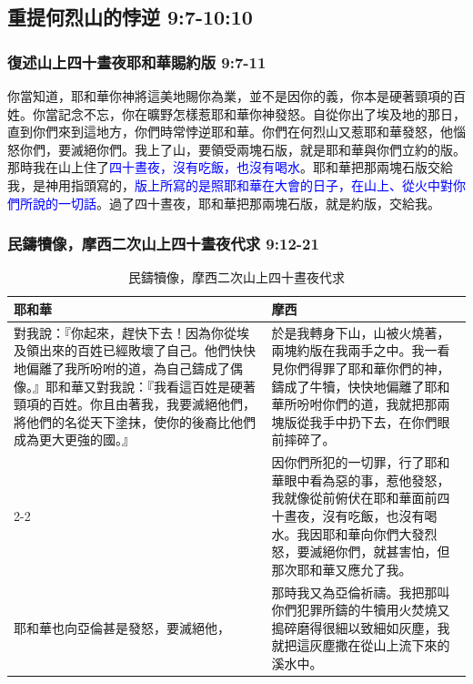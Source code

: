 \subsection{重提何烈山的悖逆 9:7-10:10}
\subsubsection{復述山上四十晝夜耶和華賜約版 9:7-11}
你當知道，耶和華你神將這美地賜你為業，並不是因你的義，你本是硬著頸項的百姓。你當記念不忘，你在曠野怎樣惹耶和華你神發怒。自從你出了埃及地的那日，直到你們來到這地方，你們時常悖逆耶和華。你們在何烈山又惹耶和華發怒，他惱怒你們，要滅絕你們。我上了山，要領受兩塊石版，就是耶和華與你們立約的版。那時我在山上住了\textcolor{blue}{四十晝夜，沒有吃飯，也沒有喝水}。耶和華把那兩塊石版交給我，是神用指頭寫的，\textcolor{blue}{版上所寫的是照耶和華在大會的日子，在山上、從火中對你們所說的一切話}。過了四十晝夜，耶和華把那兩塊石版，就是約版，交給我。

\subsubsection{民鑄犢像，摩西二次山上四十晝夜代求 9:12-21}
\begin{table}[H]
\begin{center}
\begin{tabular}{ p{6.5cm}|p{10.5cm} } \toprule
 耶和華&摩西 \\\hline
\multirow{1}{6.3cm}{對我說：『你起來，趕快下去！因為你從埃及領出來的百姓已經敗壞了自己。他們快快地偏離了我所吩咐的道，為自己鑄成了偶像。』耶和華又對我說：『我看這百姓是硬著頸項的百姓。你且由著我，我要滅絕他們，將他們的名從天下塗抹，使你的後裔比他們成為更大更強的國。』}&於是我轉身下山，山被火燒著，兩塊約版在我兩手之中。我一看見你們得罪了耶和華你們的神，鑄成了牛犢，快快地偏離了耶和華所吩咐你們的道，我就把那兩塊版從我手中扔下去，在你們眼前摔碎了。\\ \cline{2-2}
&因你們所犯的一切罪，行了耶和華眼中看為惡的事，惹他發怒，我就像從前俯伏在耶和華面前四十晝夜，沒有吃飯，也沒有喝水。我因耶和華向你們大發烈怒，要滅絕你們，就甚害怕，但那次耶和華又應允了我。\\ \hline
耶和華也向亞倫甚是發怒，要滅絕他，&那時我又為亞倫祈禱。我把那叫你們犯罪所鑄的牛犢用火焚燒又搗碎磨得很細以致細如灰塵，我就把這灰塵撒在從山上流下來的溪水中。\\ \hline
\end{tabular}
\end{center}
\caption{民鑄犢像，摩西二次山上四十晝夜代求}
\end{table}


